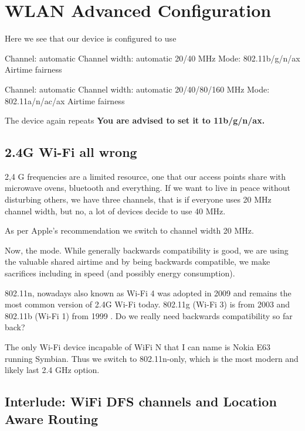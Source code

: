 \documentclass[../wifi-security.tex]{subfiles}
\begin{document}


\section{WLAN Advanced Configuration}

Here we see that our device is configured to use

Channel: automatic
Channel width: automatic 20/40 MHz
Mode: 802.11b/g/n/ax
Airtime fairness

Channel: automatic
Channel width: automatic 20/40/80/160 MHz
Mode: 802.11a/n/ac/ax
Airtime fairness

The device again repeats \textbf{You are advised to set it to 11b/g/n/ax.}

\subsection{2.4G Wi-Fi all wrong}

2,4 G frequencies are a limited resource, one that our access points share with microwave ovens, bluetooth and everything. If we want to live in peace without disturbing others, we have three channels, that is if everyone uses 20 MHz channel width, but no, a lot of devices decide to use 40 MHz.

As per Apple's recommendation we switch to channel width 20 MHz.\autocite{appleap}

Now, the mode. While generally backwards compatibility is good, we are using the valuable shared airtime and by being backwards compatible, we make sacrifices including in speed (and possibly energy consumption). \autocite{doubleedgedbackwards}

802.11n, nowadays also known as Wi-Fi 4 was adopted in 2009 and remains the most common version of 2.4G Wi-Fi today. 802.11g (Wi-Fi 3) is from 2003 and 802.11b (Wi-Fi 1) from 1999 \autocite{wikipediawifi6}. Do we really need backwards compatibility so far back?

The only Wi-Fi device incapable of WiFi N that I can name is Nokia E63 running Symbian. Thus we switch to 802.11n-only, which is the most modern and likely last 2.4 GHz option.

\subsection{Interlude: WiFi DFS channels and Location Aware Routing}
\end{document}
